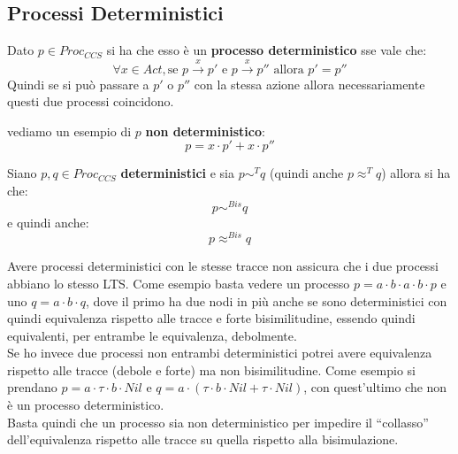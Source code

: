 \subsection{Processi Deterministici}
\begin{definizione}
  Dato $p\in Proc_{CCS}$ si ha che esso è un \textbf{processo deterministico}
  sse vale che:
  \[\forall x\in Act,\mbox{se } p\stackrel{x}{\rightarrow}p'\mbox{ e
    }p\stackrel{x}{\rightarrow}p''\mbox{ allora }p'=p''\]
  Quindi se si può passare a $p'$ o $p''$ con la stessa azione allora
  necessariamente questi due processi coincidono.
\end{definizione} \vspace{5mm} %
\begin{esempio}
  vediamo un esempio di $p$ \textbf{non deterministico}:
  \[p=x\cdot p'+x\cdot p''\]
\end{esempio}
\begin{definizione}
  Siano $p, q\in Proc_{CCS}$ \textbf{deterministici} e sia $p\sim^Tq$ (quindi
  anche $p\approx^Tq$) allora si ha che:
  \[p\sim^{Bis}q\]
  e quindi anche:
  \[p\approx^{Bis}q\]
\end{definizione} \vspace{5mm} %
Avere processi deterministici con le stesse tracce non assicura che i due
processi abbiano lo stesso LTS. Come esempio basta vedere un processo $p=a\cdot
b\cdot a\cdot b\cdot p$ e uno $q=a\cdot b\cdot q$, dove il primo ha due nodi in
più anche se sono deterministici con quindi equivalenza rispetto alle tracce e
forte bisimilitudine, essendo quindi equivalenti, per entrambe le equivalenza,
debolmente.\\ 
Se ho invece due processi non entrambi deterministici potrei avere equivalenza
rispetto alle tracce (debole e forte) ma non bisimilitudine. Come esempio si
prendano $p=a\cdot \tau\cdot b\cdot Nil$ e $q=a\cdot(\tau\cdot b\cdot Nil+\tau
\cdot Nil)$, con quest'ultimo che non è un processo deterministico.\\
Basta quindi che un processo sia non deterministico per impedire il ``collasso''
dell'equivalenza rispetto alle tracce su quella rispetto alla bisimulazione.\\
